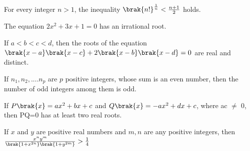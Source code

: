 \iffalse
\title{CHAPTER - 3\\Quadratic equation}
\author{AI24BTECH11028 - Ronit Ranjan}
\section{true-false}
\fi

    \item For every integer $n>1$, the inequality $\brak{n!}^\frac{1}{n} < \frac{n+1}{2}$ holds. \hfill {}
    \item The equation $2x^2 + 3x + 1 = 0$ has an irrational root. \hfill {}
    \item If $a<b<c<d$, then the roots of the equation $\brak{x-a}\brak{x-c}+2\brak{x-b}\brak{x-d}=0$ are real and distinct. \hfill {}
    \item If $n_1, n_2, ....n_p$ are $p$ positive integers, whose sum is an even number, then the number of odd integers among them is odd.\hfill {}
    \item If $P\brak{x} = ax^2+bx+c$ and $Q\brak{x}= -ax^2+dx+c$, where ac $\neq$ 0, then PQ=0 has at least two real roots. \hfill {}
    \item If $x$ and $y$ are positive real numbers and $m,n$ are any positive integers, then $\frac{x^ny^m}{\brak{1+ x^{2n}}\brak{1+ y^{2m}}} > \frac{1}{4}$ \hfill {}



